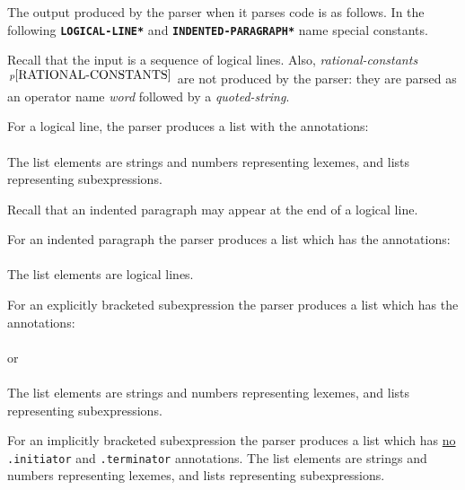 \documentclass[12pt]{article}
\newcommand{\ttkey}[1]{{\tt \bfseries #1}}
\newcommand{\pagnote}[1]{$\,^{p\pageref{#1}}$}
\begin{document}
The output produced by the parser when it parses code is as
follows.  In the following \ttkey{*LOGICAL-LINE*} and
\ttkey{*INDENTED-PARAGRAPH*} name special constants.

Recall that the input is a sequence of logical lines.  Also,
{\em rational-constants}\pagnote{RATIONAL-CONSTANTS}
are not produced by the parser: they are parsed as an operator
name {\em word} followed by a {\em quoted-string}.

For a logical line, the parser produces a list with the
annotations: \\
\hspace*{0.5in}{\tt ".initiator" => *LOGICAL-LINE*, ".terminator" => "<LF>"} \\
The list elements are strings and numbers representing lexemes, and
lists representing subexpressions.

Recall that an indented paragraph may appear at the end of a logical line.

For an indented paragraph the parser produces a list
which has the annotations: \\
\hspace*{0.5in}{\tt ".initiator" => ":",
                    ".terminator" => *INDENTED-PARAGRAPH*} \\
The list elements are logical lines.

For an explicitly bracketed subexpression the parser produces a list which has
the annotations: \\
\hspace*{0.5in}{\tt ".initiator" => "(", ".terminator" => ")"} \\
or \\
\hspace*{0.5in}{\tt ".initiator" => "[", ".terminator" => "]"} \\
The list elements are strings and numbers representing lexemes, and
lists representing subexpressions.

For an implicitly bracketed subexpression the parser produces a list which has
\underline{no} {\tt .initiator} and {\tt .terminator} annotations.
The list elements are strings and numbers representing lexemes, and
lists representing subexpressions.
\end{document}
